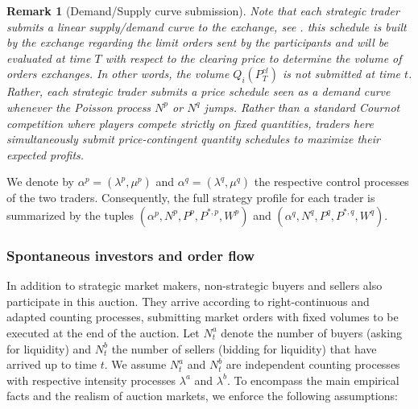 \documentclass[12pt]{article}
\newtheorem{remark}[theorem2]{Remark}
\begin{document}
\begin{remark}[Demand/Supply curve submission]
Note that each strategic trader submits a linear supply/demand curve to the exchange, see \cite{klemperer1989supply}. this schedule is built by the exchange regarding the limit orders sent by the participants and will be evaluated at time $T$ with respect to the clearing price to determine the volume of orders exchanges. In other words, the volume $Q_i(P_T^{cl})$ is not submitted at time $t$. Rather, each strategic trader submits a price schedule seen as a demand curve whenever
the Poisson process $N^p$ or $N^q$ jumps. Rather than a standard Cournot competition where players compete strictly on fixed quantities, traders here simultaneously submit price-contingent quantity schedules to maximize their expected profits. 
\end{remark}

We denote by $\alpha^p = (\lambda^p,\mu^p)$ and $\alpha^q = (\lambda^q,\mu^q)$ the respective control processes of the two traders. Consequently, the full strategy profile for each trader is summarized by the tuples $(\alpha^p, N^{p}, P^{p}, P^{*,p}, W^{p})$ and $(\alpha^q, N^{q}, P^{q}, P^{*,q}, W^{q})$.
\subsubsection{Spontaneous investors and order flow}
In addition to strategic market makers, non-strategic buyers and sellers also participate in this auction. They arrive according to right-continuous and adapted counting processes, submitting market orders with fixed volumes to be executed at the end of the auction. Let $N_t^{a}$ denote the number of buyers (asking for liquidity) and $N_t^{b}$ the number of sellers (bidding for liquidity) that have arrived up to time $t$. We assume $N_t^{a}$ and $N_t^{b}$ are independent counting processes with respective intensity processes $\lambda^a$ and $\lambda^b$. To encompass the main empirical facts and the realism of auction markets, we enforce the following assumptions:
\end{document}
